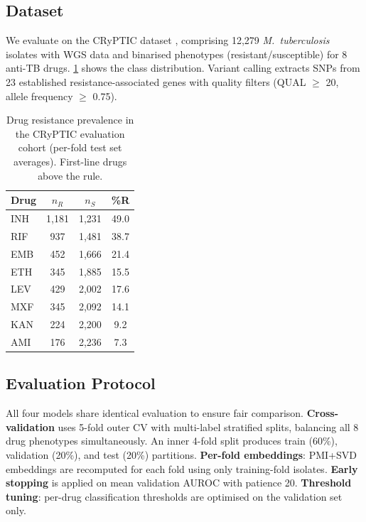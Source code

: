 \documentclass{article}
\theoremstyle{plain}
\theoremstyle{definition}
\theoremstyle{remark}
\begin{document}
\subsection{Dataset}

We evaluate on the CRyPTIC dataset \citep{cryptic2022mic}, comprising 12{,}279 \textit{M.~tuberculosis} isolates with WGS data and binarised phenotypes (resistant/susceptible) for 8 anti-TB drugs. \cref{tab:prevalence} shows the class distribution. Variant calling extracts SNPs from 23 established resistance-associated genes with quality filters (QUAL $\geq$ 20, allele frequency $\geq$ 0.75).

\begin{table}[t]
\caption{Drug resistance prevalence in the CRyPTIC evaluation cohort (per-fold test set averages). First-line drugs above the rule.}
\label{tab:prevalence}
\vskip 0.1in
\begin{center}
\begin{small}
\begin{tabular}{lccc}
\toprule
Drug & $n_R$ & $n_S$ & \%R \\
\midrule
INH & 1{,}181 & 1{,}231 & 49.0 \\
RIF & 937 & 1{,}481 & 38.7 \\
EMB & 452 & 1{,}666 & 21.4 \\
ETH & 345 & 1{,}885 & 15.5 \\
\midrule
LEV & 429 & 2{,}002 & 17.6 \\
MXF & 345 & 2{,}092 & 14.1 \\
KAN & 224 & 2{,}200 & 9.2 \\
AMI & 176 & 2{,}236 & 7.3 \\
\bottomrule
\end{tabular}
\end{small}
\end{center}
\vskip -0.1in
\end{table}

\subsection{Evaluation Protocol}

All four models share identical evaluation to ensure fair comparison.
\textbf{Cross-validation} uses 5-fold outer CV with multi-label stratified splits, balancing all 8 drug phenotypes simultaneously. An inner 4-fold split produces train (60\%), validation (20\%), and test (20\%) partitions.
\textbf{Per-fold embeddings}: PMI+SVD embeddings are recomputed for each fold using only training-fold isolates.
\textbf{Early stopping} is applied on mean validation AUROC with patience 20.
\textbf{Threshold tuning}: per-drug classification thresholds are optimised on the validation set only.
\end{document}
